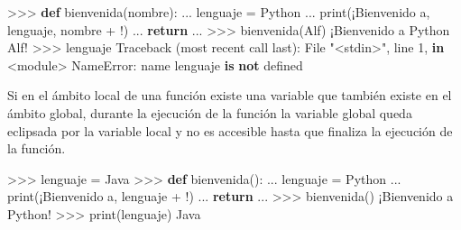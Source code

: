 \documentclass[
  spanish,
  a4paper,
]{scrreport}
\newenvironment{Shaded}{\begin{snugshade}}{\end{snugshade}}
\newcommand{\BuiltInTok}[1]{\textcolor[rgb]{0.00,0.23,0.31}{#1}}
\newcommand{\ControlFlowTok}[1]{\textcolor[rgb]{0.00,0.23,0.31}{\textbf{#1}}}
\newcommand{\DecValTok}[1]{\textcolor[rgb]{0.68,0.00,0.00}{#1}}
\newcommand{\KeywordTok}[1]{\textcolor[rgb]{0.00,0.23,0.31}{\textbf{#1}}}
\newcommand{\NormalTok}[1]{\textcolor[rgb]{0.00,0.23,0.31}{#1}}
\newcommand{\OperatorTok}[1]{\textcolor[rgb]{0.37,0.37,0.37}{#1}}
\newcommand{\PreprocessorTok}[1]{\textcolor[rgb]{0.68,0.00,0.00}{#1}}
\newcommand{\StringTok}[1]{\textcolor[rgb]{0.13,0.47,0.30}{#1}}
\begin{document}
\begin{Shaded}
\begin{Highlighting}[]
\OperatorTok{\textgreater{}\textgreater{}\textgreater{}} \KeywordTok{def}\NormalTok{ bienvenida(nombre):}
\NormalTok{...     lenguaje }\OperatorTok{=} \StringTok{\textquotesingle{}Python\textquotesingle{}}
\NormalTok{...     }\BuiltInTok{print}\NormalTok{(}\StringTok{\textquotesingle{}¡Bienvenido a\textquotesingle{}}\NormalTok{, lenguaje, nombre }\OperatorTok{+} \StringTok{\textquotesingle{}!\textquotesingle{}}\NormalTok{)}
\NormalTok{...     }\ControlFlowTok{return}
\NormalTok{...}
\OperatorTok{\textgreater{}\textgreater{}\textgreater{}}\NormalTok{ bienvenida(}\StringTok{\textquotesingle{}Alf\textquotesingle{}}\NormalTok{)}
\NormalTok{¡Bienvenido a Python Alf}\OperatorTok{!}
\OperatorTok{\textgreater{}\textgreater{}\textgreater{}}\NormalTok{ lenguaje}
\NormalTok{Traceback (most recent call last):}
\NormalTok{  File }\StringTok{"\textless{}stdin\textgreater{}"}\NormalTok{, line }\DecValTok{1}\NormalTok{, }\KeywordTok{in} \OperatorTok{\textless{}}\NormalTok{module}\OperatorTok{\textgreater{}}
\PreprocessorTok{NameError}\NormalTok{: name }\StringTok{\textquotesingle{}lenguaje\textquotesingle{}} \KeywordTok{is} \KeywordTok{not}\NormalTok{ defined}
\end{Highlighting}
\end{Shaded}

Si en el ámbito local de una función existe una variable que también
existe en el ámbito global, durante la ejecución de la función la
variable global queda eclipsada por la variable local y no es accesible
hasta que finaliza la ejecución de la función.

\begin{Shaded}
\begin{Highlighting}[]
\OperatorTok{\textgreater{}\textgreater{}\textgreater{}}\NormalTok{ lenguaje }\OperatorTok{=} \StringTok{\textquotesingle{}Java\textquotesingle{}}
\OperatorTok{\textgreater{}\textgreater{}\textgreater{}} \KeywordTok{def}\NormalTok{ bienvenida():}
\NormalTok{...     lenguaje }\OperatorTok{=} \StringTok{\textquotesingle{}Python\textquotesingle{}}
\NormalTok{...     }\BuiltInTok{print}\NormalTok{(}\StringTok{\textquotesingle{}¡Bienvenido a\textquotesingle{}}\NormalTok{, lenguaje }\OperatorTok{+} \StringTok{\textquotesingle{}!\textquotesingle{}}\NormalTok{)}
\NormalTok{...     }\ControlFlowTok{return}
\NormalTok{...}
\OperatorTok{\textgreater{}\textgreater{}\textgreater{}}\NormalTok{ bienvenida()}
\NormalTok{¡Bienvenido a Python}\OperatorTok{!}
\OperatorTok{\textgreater{}\textgreater{}\textgreater{}} \BuiltInTok{print}\NormalTok{(lenguaje)}
\NormalTok{Java}
\end{Highlighting}
\end{Shaded}
\end{document}

